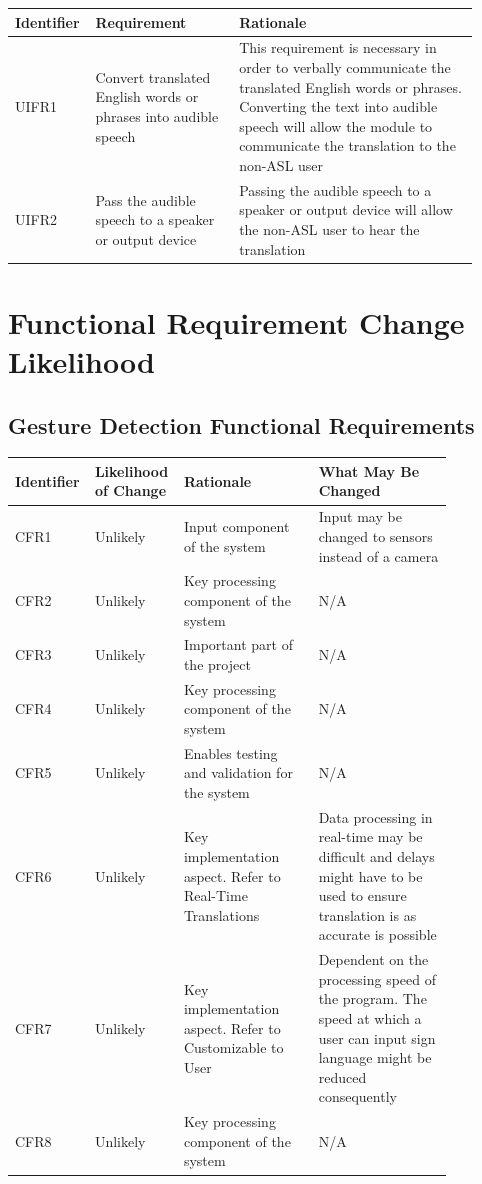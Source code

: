 \documentclass[12pt]{article}
\begin{document}
\renewcommand{\arraystretch}{1.2}
\noindent \begin{tabularx}{\textwidth}{p{0.12\linewidth}|p{0.3\linewidth}|p{0.5\linewidth}}
\toprule
\textbf{Identifier} & \textbf{Requirement} & \textbf{Rationale}\\
\midrule
UIFR1
& Convert translated English words or phrases into audible speech
& This requirement is necessary in order to verbally communicate the translated English words or phrases. Converting the text into audible speech will allow the module to communicate the translation to the non-ASL user\\
\hline
UIFR2
& Pass the audible speech to a speaker or output device
& Passing the audible speech to a speaker or output device will allow the non-ASL user to hear the translation\\
\bottomrule
\end{tabularx}

\section{Functional Requirement Change Likelihood}
\subsection{Gesture Detection Functional Requirements}

\renewcommand{\arraystretch}{1.2}
\noindent \begin{tabularx}{\textwidth}{p{0.12\linewidth}|p{0.15\linewidth}|p{0.3\linewidth}|p{0.3\linewidth}}
\toprule
\textbf{Identifier} & \textbf{Likelihood of Change} & \textbf{Rationale} & \textbf{What May Be Changed}\\
\midrule
CFR1 
& Unlikely
& Input component of the system
& Input may be changed to sensors instead of a camera\\
\hline
CFR2
& Unlikely
& Key processing component of the system
& N/A\\
\hline
CFR3
& Unlikely
& Important part of the project
& N/A\\
\hline
CFR4
& Unlikely
& Key processing component of the system
& N/A\\
\hline
CFR5
& Unlikely
& Enables testing and validation for the system
& N/A\\
\hline
CFR6
& Unlikely
& Key implementation aspect. Refer to Real-Time Translations
& Data processing in real-time may be difficult and delays might have to be used to ensure translation is as accurate is possible\\
\hline
CFR7
& Unlikely
& Key implementation aspect. Refer to Customizable to User
& Dependent on the processing speed of the program. The speed at which a user can input sign language might be reduced consequently\\
\hline
CFR8
& Unlikely
& Key processing component of the system
& N/A\\
\bottomrule
\end{tabularx}
\end{document}
